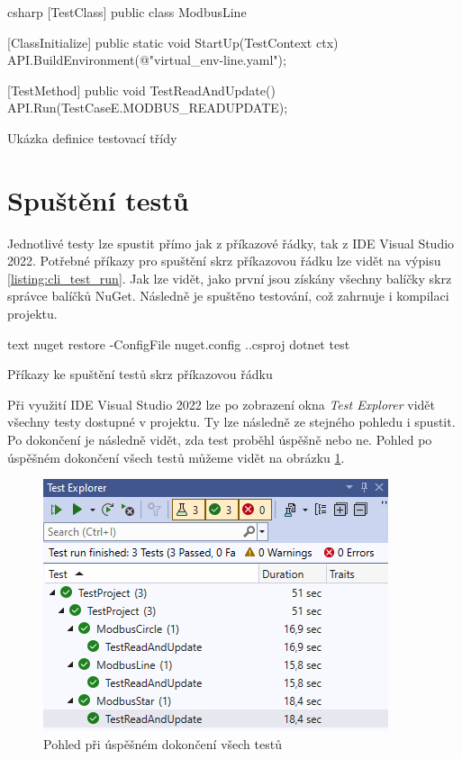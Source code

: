 \begin{listing}[htbp]
    \centering
    \begin{cminted}[breaklines,autogobble, fontsize=\footnotesize]{csharp}
[TestClass]
public class ModbusLine
{
    [ClassInitialize]
    public static void StartUp(TestContext ctx)
    {
       API.BuildEnvironment(@"virtual_env\modbus\topologies\modbus-line.yaml");
    }

    [TestMethod]
    public void TestReadAndUpdate()
    {
       API.Run(TestCaseE.MODBUS_READUPDATE);
    }
}
    \end{cminted}
\caption{Ukázka definice testovací třídy}
\label{listing:test_class}
\end{listing}


\section{Spuštění testů}

Jednotlivé testy lze spustit přímo jak z příkazové řádky, tak z IDE Visual Studio 2022. 
Potřebné příkazy pro spuštění skrz příkazovou řádku lze vidět na výpisu \ref{listing:cli_test_run}. Jak lze vidět, jako první jsou získány všechny balíčky skrz správce balíčků NuGet. Následně je spuštěno testování, což zahrnuje i kompilaci projektu. 

\begin{listing}[htbp]
    \centering
    \begin{cminted}[breaklines,autogobble, fontsize=\footnotesize]{text}
nuget restore -ConfigFile nuget.config .\TestProject.csproj
dotnet test
    \end{cminted}
    \caption{Příkazy ke spuštění testů skrz příkazovou řádku}
\label{listing:cli_test_run}
\end{listing}


Při využití IDE Visual Studio 2022 lze po zobrazení okna \textit{Test Explorer} vidět všechny testy dostupné v projektu. Ty lze následně ze stejného pohledu i spustit. Po dokončení je následně vidět, zda test proběhl úspěšně nebo ne. Pohled po úspěšném dokončení všech testů můžeme vidět na obrázku \ref{fig:modbus_test_success}. 

\begin{figure}[htbp]
    \centering 
    \includegraphics{assets/img/modbus_test.png}
    \caption{Pohled při úspěšném dokončení všech testů}
    \label{fig:modbus_test_success}
\end{figure}

